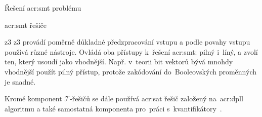 \documentclass[thesis=M,czech]{FITthesis}[2012/06/26]
\newcommand{\acrlabel}[1]{acr:#1}
\newcommand{\acr}[1]{\acrshort{\acrlabel{#1}}}
\newcommand{\cit}[1]{\cite{#1}}
\newcommand{\set}[1]{\ensuremath{\mathcal{#1}}}
\begin{document}
\begin{section}{Řešení \acr{smt} problému}
\begin{subsection}{\acr{smt} řešiče}
\begin{paragraph}{z3}
z3 provádí poměrně důkladné předzpracování vstupu
a podle povahy vstupu používá různé nástroje.
Ovládá oba přístupy k~řešení
\acr{smt}: pilný i~líný,
a zvolí ten, který usoudí jako vhodnější.
Např. v~teorii bit vektorů bývá mnohdy
vhodnější použít pilný přístup,
protože zakódování do~Booleovských proměnných je snadné.

Kromě komponent \set{T}-řešičů
se dále používá \acr{sat} řešič
založený na~\acr{dpll} algoritmu
a také samostatná komponenta
pro~práci s~kvantifikátory~\cit{z3-art}.
\end{paragraph} %


\end{subsection} %


\end{section} %

\end{document}
